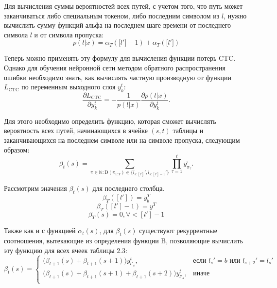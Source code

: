 
Для вычисления суммы вероятностей всех путей, с учетом того, что путь может заканчиваться либо специальным токеном, либо последним символом из $l$, нужно вычислить сумму функций альфа на последнем шаге времени от последнего символа $l$ и от символа пропуска:
\begin{equation}
    p(l|x) = \alpha_T(\bigl[l'\bigr]-1)+\alpha_T(\bigl[l'\bigr])
\end{equation}

Теперь можно применять эту формулу для вычисления функции потерь CTC. Однако для обучения нейронной сети методом обратного распространения ошибки необходимо знать, как вычислять частную производную от функции $L_{\text{CTC}}$ по переменным выходного слоя $y_k^t$:
\begin{equation}
    \dfrac{\partial L_{\text{CTC}}}{\partial y_k^t} = -\dfrac{1}{p(l|x)}\dfrac{\partial p(l|x)}{\partial y_k^t}.
\end{equation}

Для этого необходимо определить функцию, которая сможет вычислять вероятность всех путей, начинающихся в ячейке $(s,t)$ таблицы и заканчивающихся на последнем символе или на символе пропуска, следующим образом:
\begin{equation}
    \beta_t(s) = \sum\limits_{\pi\in\mathbb{N}:\text{D}(\pi_{1:T})\in\bigl\{l_{s:[l']}',l_{s:[l']-1}'\bigr\}}\prod\limits_{\tau=1}^t y_{\pi_{\tau}}^\tau.
\end{equation}

Рассмотрим значения $\beta_t(s)$ для последнего столбца.
\begin{equation}
    \beta_T([l']) = y_b^T 
\end{equation}
\begin{equation}
    \beta_T([l']-1) = y^T
\end{equation}
\begin{equation}
    \beta_T(s) = 0, \forall < [l'] - 1 
\end{equation}

Также как и с функцией $\alpha_t(s)$, для $\beta_t(s)$ существуют рекуррентные соотношения, вытекающие из определения функции $\text{B}$, позволяющие вычислить эту функцию для всех ячеек таблицы 2.3:
\begin{equation}
    \beta_t(s) = 
    \begin{cases}
        \bigl(\beta_{t+1}(s) + \beta_{t+1}(s+1)\bigr)y_{l'_s}^t, &\text{если } l_s'=b \text{ или } l_{s+2}'=l_s'\\
        \bigl(\beta_{t+1}(s) + \beta_{t+1}(s+1) + \beta_{t+1}(s+2)\bigr)y_{l'_s}^t, &\text{иначе}\\
    \end{cases}
\end{equation}

